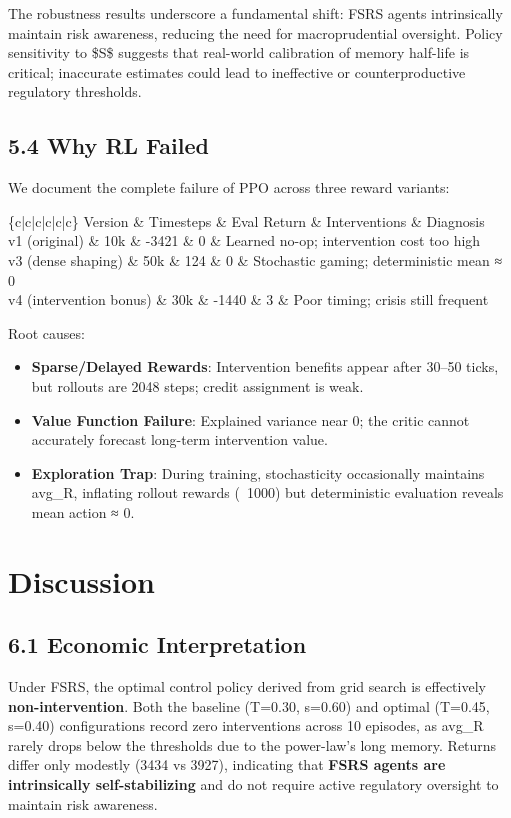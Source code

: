 \documentclass[11pt]{article}
\begin{document}
{{{The robustness results underscore a fundamental shift: FSRS agents intrinsically maintain risk awareness, reducing the need for macroprudential oversight. Policy sensitivity to \$S\$ suggests that real-world calibration of memory half-life is critical; inaccurate estimates could lead to ineffective or counterproductive regulatory thresholds.
\subsection{5.4 Why RL Failed}

We document the complete failure of PPO across three reward variants:

\begin{table}[ht]
\centering
\begin{tabular}\{c|c|c|c|c|c\}
\toprule
Version \& Timesteps \& Eval Return \& Interventions \& Diagnosis \\
\midrule
v1 (original) \& 10k \& -3421 \& 0 \& Learned no-op; intervention cost too high \\
v3 (dense shaping) \& 50k \& 124 \& 0 \& Stochastic gaming; deterministic mean ≈ 0 \\
v4 (intervention bonus) \& 30k \& -1440 \& 3 \& Poor timing; crisis still frequent \\
\bottomrule
\end{tabular}
\end{table}
Root causes:
\begin{itemize}
  \item \textbf{Sparse/Delayed Rewards}: Intervention benefits appear after 30–50 ticks, but rollouts are 2048 steps; credit assignment is weak.
  \item \textbf{Value Function Failure}: Explained variance near 0; the critic cannot accurately forecast long-term intervention value.
  \item \textbf{Exploration Trap}: During training, stochasticity occasionally maintains avg\_R, inflating rollout rewards (~1000) but deterministic evaluation reveals mean action ≈ 0.
\end{itemize}


\section{Discussion}
\subsection{6.1 Economic Interpretation}
Under FSRS, the optimal control policy derived from grid search is effectively \textbf{non-intervention}. Both the baseline (T=0.30, s=0.60) and optimal (T=0.45, s=0.40) configurations record zero interventions across 10 episodes, as avg\_R rarely drops below the thresholds due to the power-law's long memory. Returns differ only modestly (3434 vs 3927), indicating that \textbf{FSRS agents are intrinsically self-stabilizing} and do not require active regulatory oversight to maintain risk awareness.

}}}
\end{document}
